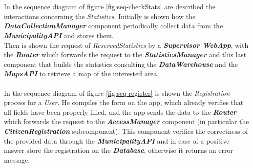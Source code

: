 \documentclass[a4paper]{report}
\begin{document}
\\\\
In the sequence diagram of figure \ref{fig:seq-checkStats} are described the interactions concerning the \textit{Statistics}. Initially is shown how the \textbf{\textit{DataCollectionManager}} component periodically collect data from the \textit{\textbf{MunicipalityAPI}} and stores them. \\
Then is shown the request of \textit{ReservedStatistics} by a \textit{\textbf{Supervisor WebApp}}, with the \textbf{\textit{Router}} which forwards the request to the \textit{\textbf{StatisticsManager}} and this last component that builds the statistics consulting the \textbf{\textit{DataWarehouse}} and the \textit{\textbf{MapsAPI}} to retrieve a map of the interested area.
\\\\
In the sequence diagram of figure \ref{fig:seq-register} is shown the \textit{Registration} process for a \textit{User}. He compiles the form on the app, which already verifies that all fields have been properly filled, and the app sends the data to the \textbf{\textit{Router}} which forwards the request to the \textbf{\textit{AccessManager}} component (in particular the \textbf{\textit{CitizenRegistration}} subcomponent). This component verifies the correctness of the provided data through the \textbf{\textit{MunicipalityAPI}} and in case of a positive answer store the registration on the \textbf{\textit{Database}}, otherwise it returns an error message.
\end{document}
